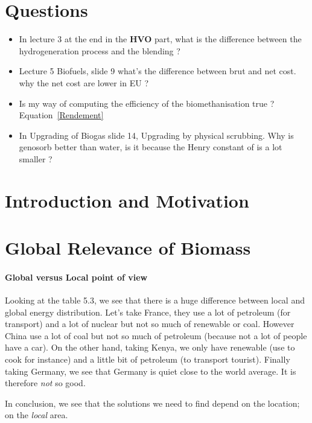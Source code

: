 \documentclass[10pt,a4paper]{article}
\begin{document}
\begin{titlepage}


\pagestyle{empty} %

\titleGP %

\end{titlepage}
\section{Questions}
\begin{itemize}
\item In lecture 3 at the end in the \textbf{HVO} part, what is the difference between the hydrogeneration process and the blending ?
\item Lecture 5 Biofuels, slide 9 what's the difference between brut and net cost. why the net cost are lower in EU ?
\item Is my way of computing the efficiency of the biomethanisation true ? Equation~\ref{Rendement}
\item In Upgrading of Biogas slide 14, Upgrading by physical scrubbing. Why is genosorb better than water, is it because the Henry constant of  is a lot smaller ?
\end{itemize}
\section{Introduction and Motivation}
\section{Global Relevance of Biomass}
\paragraph{Global versus Local point of view}
Looking at the table 5.3, we see that there is a huge difference between local and global energy distribution. Let's take France, they use a lot of petroleum (for transport) and a lot of nuclear but not so much of renewable or coal. However China use a lot of coal but not so much of petroleum (because not a lot of people have a car). On the other hand, taking Kenya, we only have renewable (use to cook for instance) and a little bit of petroleum (to transport tourist). Finally taking Germany, we see that Germany is quiet close to the world average. It is therefore \emph{not} so good.

In conclusion, we see that the solutions we need to find depend on the location; on the \emph{local} area.
\end{document}
